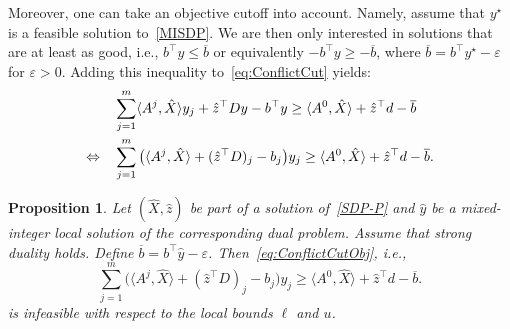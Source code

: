 \documentclass[10pt, a4paper]{article}
\newcommand{\skal}[2]{\langle{#1},{#2}\rangle}
\newcommand{\T}{^{\top}}
\newtheorem{proposition}[theorem]{Proposition}
\begin{document}
Moreover, one can take an objective cutoff into account. Namely, assume
that $y^\star$ is a feasible solution to~\eqref{MISDP}. We are then only
interested in solutions that are at least as good, i.e.,
$b\T y \leq \overline{b}$ or equivalently $- b\T y \geq - \overline{b}$,
where $\overline{b} = b\T y^\star - \varepsilon$ for $\varepsilon >
0$. Adding this inequality to~\eqref{eq:ConflictCut} yields:
\begin{align}
  & \sum_{j=1}^m \skal{A^j}{\hat{X}} y_j + \hat{z}\T D y - b\T y \geq
    \skal{A^0}{\hat{X}} + \hat{z}\T d - \overline{b}\notag\\
  \Leftrightarrow\quad
  & \sum_{j=1}^m \big(\skal{A^j}{\hat{X}} + (\hat{z}\T D)_j - b_j\big) y_j \geq
    \skal{A^0}{\hat{X}} + \hat{z}\T d - \overline{b}.\label{eq:ConflictCutObj}
\end{align}

\begin{proposition}
  Let $(\hat{X}, \hat{z})$ be part of a solution of~\eqref{SDP-P} and
  $\hat{y}$ be a mixed-integer local solution of the corresponding dual
  problem. Assume that strong duality holds. Define
  $\overline{b} = b\T \hat{y} -
  \varepsilon$. Then~\eqref{eq:ConflictCutObj}, i.e.,
  \[
    \sum_{j=1}^m \big(\skal{A^j}{\hat{X}} + (\hat{z}\T D)_j - b_j\big) y_j \geq
    \skal{A^0}{\hat{X}} + \hat{z}\T d - \overline{b}.
  \]
  is infeasible with respect to the local bounds $\ell$ and $u$.
\end{proposition}
\end{document}
